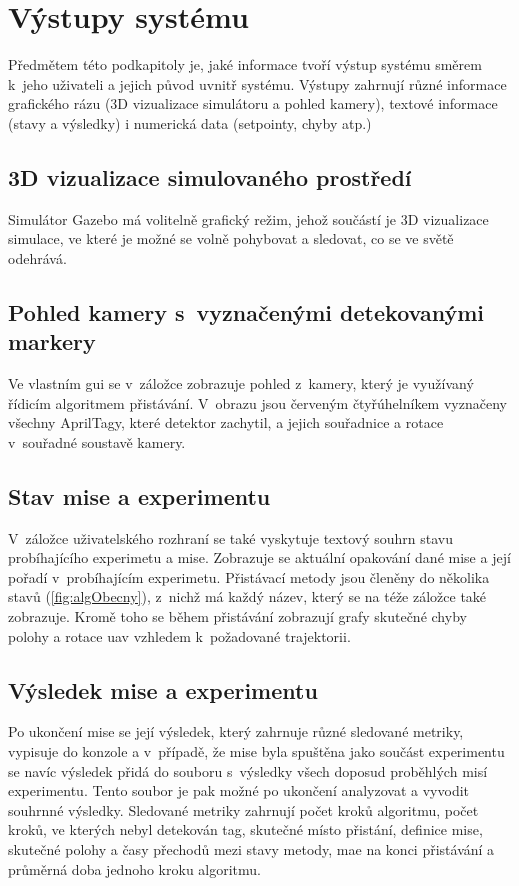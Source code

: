   \section{Výstupy systému} \label{sec:outputs}
  Předmětem této podkapitoly je, jaké informace tvoří výstup systému směrem k~jeho uživateli a jejich původ uvnitř systému. Výstupy zahrnují různé informace grafického rázu (3D vizualizace simulátoru a pohled kamery), textové informace (stavy a výsledky) i numerická data (setpointy, chyby atp.)
    \subsection{3D vizualizace simulovaného prostředí}
      Simulátor Gazebo má volitelně grafický režim, jehož součástí je 3D vizualizace simulace, ve které je možné se volně pohybovat a sledovat, co se ve světě odehrává.
    \subsection{Pohled kamery s~vyznačenými detekovanými markery}
      Ve vlastním \acrshort{gui} se v~záložce  zobrazuje pohled z~kamery, který je využívaný řídicím algoritmem přistávání. V~obrazu jsou červeným čtyřúhelníkem vyznačeny všechny AprilTagy, které detektor zachytil, a jejich souřadnice a rotace v~souřadné soustavě kamery.
    \subsection{Stav mise a experimentu}
      V~záložce  uživatelského rozhraní se také vyskytuje textový souhrn stavu probíhajícího experimetu a mise. Zobrazuje se aktuální opakování dané mise a její pořadí v~probíhajícím experimetu. Přistávací metody jsou členěny do několika stavů (\cref{fig:algObecny}), z~nichž má každý název, který se na téže záložce také zobrazuje. Kromě toho se během přistávání zobrazují grafy skutečné chyby polohy a rotace \acrshort{uav} vzhledem k~požadované trajektorii.
    \subsection{Výsledek mise a experimentu}
      Po ukončení mise se její výsledek, který zahrnuje různé sledované metriky,
      vypisuje do konzole a v~případě, že mise byla spuštěna jako součást experimentu se navíc výsledek přidá do souboru s~výsledky všech doposud proběhlých misí experimentu. Tento soubor je pak možné po ukončení analyzovat a vyvodit souhrnné výsledky. Sledované metriky zahrnují počet kroků algoritmu, počet kroků, ve kterých nebyl detekován tag, skutečné místo přistání, definice mise, skutečné polohy a časy přechodů mezi stavy metody, \acrshort{mae} na konci přistávání a průměrná doba jednoho kroku algoritmu.
